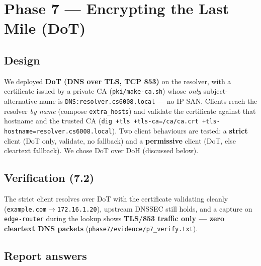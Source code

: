 \documentclass[11pt,a4paper]{article}
\begin{document}
\section{Phase 7 --- Encrypting the Last Mile (DoT)}

\subsection{Design}
We deployed \textbf{DoT (DNS over TLS, TCP 853)} on the resolver, with a certificate issued by a
private CA (\texttt{pki/make-ca.sh}) whose \emph{only} subject-alternative name is
\texttt{DNS:resolver.cs6008.local} --- no IP SAN. Clients reach the resolver \emph{by name}
(compose \texttt{extra\_hosts}) and validate the certificate against that hostname and the trusted CA
(\texttt{dig +tls +tls-ca=/ca/ca.crt +tls-hostname=resolver.cs6008.local}). Two client behaviours are
tested: a \textbf{strict} client (DoT only, validate, no fallback) and a \textbf{permissive} client
(DoT, else cleartext fallback). We chose DoT over DoH (discussed below).

\subsection{Verification (7.2)}
The strict client resolves over DoT with the certificate validating cleanly
(\texttt{example.com}$\to$\texttt{172.16.1.20}), upstream DNSSEC still holds, and a capture on
\texttt{edge-router} during the lookup shows \textbf{TLS/853 traffic only --- zero cleartext DNS
packets} (\texttt{phase7/evidence/p7\_verify.txt}).

\subsection{Report answers}
\end{document}
